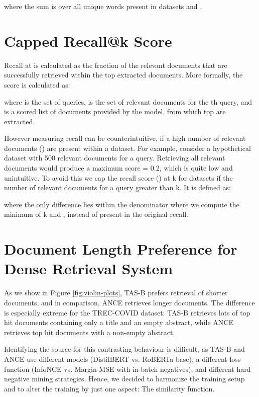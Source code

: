 \documentclass{article}
\begin{document}
 

where the sum is over all unique words  present in datasets  and .


\section{Capped Recall@k Score}\label{sec:capped_recall_score}
\vspace{-2mm}

Recall at  is calculated as the fraction of the relevant documents that are successfully retrieved within the top  extracted documents. More formally, the  score is calculated as:



where  is the set of queries,  is the set of relevant documents for the th query, and  is a scored list of documents provided by the model, from which top  are extracted. 

However measuring recall can be counterintuitive, if a high number of relevant documents () are present within a dataset. For example, consider a hypothetical dataset with 500 relevant documents for a query. Retrieving all relevant documents would produce a maximum  score = 0.2, which is quite low and unintuitive. To avoid this we cap the recall score () at k for datasets if the number of relevant documents for a query greater than k. It is defined as: 

 

where the only difference lies within the denominator where we compute the minimum of k and , instead of  present in the original recall.

\section{Document Length Preference for Dense Retrieval System} \label{sec:dense_retrieval_length_preference} 

As we show in Figure \ref{fig:violin-plots}, TAS-B prefers retrieval of shorter documents, and in comparison, ANCE retrieves longer documents. The difference is especially extreme for the TREC-COVID dataset: TAS-B retrieves lots of top hit documents containing only a title and an empty abstract, while ANCE retrieves top hit documents with a non-empty abstract.

Identifying the source for this contrasting behaviour is difficult, as TAS-B and ANCE use different models (DistilBERT vs. RoBERTa-base), a different loss function (InfoNCE \cite{oord2019representation} vs. Margin-MSE \cite{hofstatter2021improving} with in-batch negatives), and different hard negative mining strategies. Hence, we decided to harmonize the training setup and to alter the training by just one aspect: The similarity function.
\end{document}
